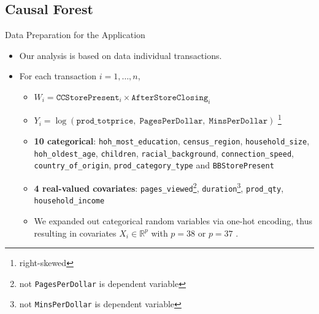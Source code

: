 \documentclass[mathserif, xcolor=table]{beamer}
\begin{document}
\subsection{Causal Forest}
\begin{frame}{Data Preparation for the Application}
	\begin{itemize}
		\item Our analysis is based on data individual transactions. 
		\item For each transaction $i=1,\dots,n$,
		\begin{itemize}
			\item $W_i=\texttt{CCStorePresent}_i\times\texttt{AfterStoreClosing}_i$
			\item $Y_i=\log\left(\texttt{prod\_totprice},\;\texttt{PagesPerDollar},\;\texttt{MinsPerDollar}\right)$ \footnote{right-skewed}
			\item  \textbf{10 categorical}: \texttt{hoh\_most\_education}, \texttt{census\_region}, \texttt{household\_size}, \texttt{hoh\_oldest\_age}, \texttt{children}, \texttt{racial\_background}, \texttt{connection\_speed}, \texttt{country\_of\_origin}, \texttt{prod\_category\_type} and \texttt{BBStorePresent}
			\item \textbf{4 real-valued covariates}: \texttt{pages\_viewed}\footnote{not \texttt{PagesPerDollar} is dependent variable}, \texttt{duration}\footnote{not \texttt{MinsPerDollar} is dependent variable}, \texttt{prod\_qty}, \texttt{household\_income}
			\item We expanded out categorical random variables via one-hot encoding, thus resulting in covariates $X_i \in \mathbb{R}^p$  with $p = 38$ or $p = 37$ .
		\end{itemize}
	\end{itemize}
	
\end{frame}
\end{document}
